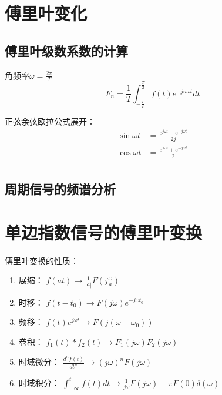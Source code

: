\documentclass[UTF8]{ctexart}
\begin{document}
    \section{傅里叶变化}

    \subsection{傅里叶级数系数的计算}  
    角频率$\omega= \frac{2\pi}{T}$
    \begin{equation*}
        F_n=\frac{1}{T}\int_{-\frac{T}{2}}^{\frac{T}{2}}f(t)e^{-jn\omega t}dt
    \end{equation*}

    \begin{tcolorbox}[green]
        正弦余弦欧拉公式展开：
        \begin{equation*}
            \begin{aligned}
                \sin \omega t &= \frac {e^{j \omega t}- e^{-j \omega t}}{2 j} \\
                \cos \omega t &= \frac {e^{j \omega t}+ e^{-j \omega t}}{2  } \\
            \end{aligned}
        \end{equation*}
    \end{tcolorbox}

    \subsection{周期信号的频谱分析}

    \section{单边指数信号的傅里叶变换}

    傅里叶变换的性质：
    \begin{enumerate}
        \item 展缩：     $f(at) \rightarrow  \frac{1}{|a|} F(j \frac{\omega}{a})$
        \item 时移：     $f(t-t_0) \rightarrow F(j\omega) e^{-j\omega t_0}$
        \item 频移：     $f(t)e^{j\omega t} \rightarrow F(j(\omega-\omega_0))$
        \item 卷积：     $f_1(t) \ast f_2(t) \rightarrow F_1(j\omega) F_2(j\omega) $
        \item 时域微分： $\frac{d^n f(t)}{d t^n} \rightarrow (j\omega)^n F(j\omega)$
        \item 时域积分： $\int_{-\infty}^{t}f(t)dt \rightarrow \frac{1}{j\omega}F(j\omega)+\pi F(0) \delta(\omega)$
    \end{enumerate}
\end{document}
